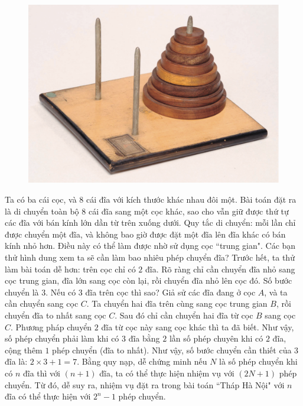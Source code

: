 		\begin{figure}
		\centering
		\captionsetup{labelformat= empty, justification=centering}
		\includegraphics[width=1\linewidth]{2.1}
		\vspace*{-15pt}
	\end{figure}
	Ta có ba cái cọc, và  $8$ cái đĩa với kích thước khác nhau đôi một. Bài toán đặt ra là di chuyển toàn bộ $8$ cái đĩa sang một cọc khác, sao cho vẫn giữ được thứ tự các đĩa với bán kính lớn dần từ trên xuống dưới. Quy tắc di chuyển: mỗi lần chỉ được chuyển một đĩa, và không bao giờ được đặt một đĩa lên đĩa khác có bán kính nhỏ hơn. Điều này có thể làm được nhờ sử dụng cọc ``trung gian".
	\vskip 0.1cm
	Các bạn thử hình dung xem ta sẽ cần làm bao nhiêu phép chuyển đĩa?
	\vskip 0.1cm
	Trước hết, ta thử làm bài toán dễ hơn: trên cọc chỉ có $2$ đĩa. Rõ ràng chỉ cần chuyển đĩa nhỏ sang cọc trung gian, đĩa lớn sang cọc còn lại, rồi chuyển đĩa nhỏ lên cọc đó. Số bước chuyển là $3$.
	\vskip 0.1cm
	Nếu có $3$ đĩa trên cọc thì sao? Giả sử các đĩa đang ở cọc $A$, và ta cần chuyển sang cọc $C$. Ta chuyển hai đĩa trên cùng sang cọc  trung gian $B$, rồi chuyển đĩa to nhất sang cọc $C$. Sau đó chỉ cần chuyển hai đĩa từ cọc $B$ sang cọc $C$. Phương pháp chuyển $2$ đĩa từ cọc này sang cọc khác thì ta đã biết. Như vậy, số phép chuyển phải làm khi có $3$ đĩa bằng $2$ lần số phép chuyên khi có $2$ đĩa, cộng thêm $1$ phép chuyển (đĩa to nhất). 
	\vskip 0.1cm
	Như vậy, số bước chuyển cần thiết của $3$ đĩa là: $2\times 3 + 1 = 7$. Bằng quy nạp, dễ chứng minh nếu $N$ là số phép chuyển khi có $n$ đĩa thì với $(n+1)$ đĩa, ta có thể thực hiện nhiệm vụ với $(2N+1)$ phép chuyển. Từ đó, dễ suy ra, nhiệm vụ đặt ra trong bài toán ``Tháp Hà Nội" với $n$ đĩa có thể thực hiện với $2^n- 1$  phép chuyển.

